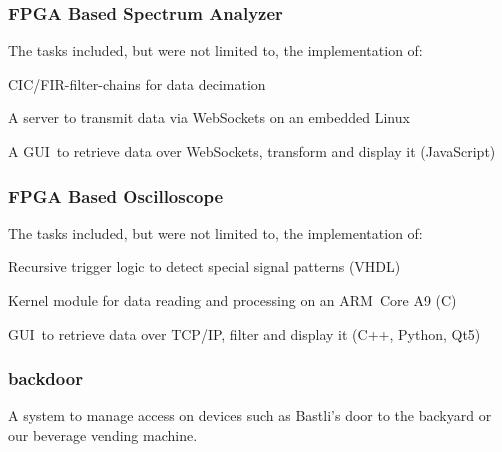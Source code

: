 \begin{timeline}
    \subsubsection{FPGA Based Spectrum Analyzer}
    The tasks included, but were not limited to, the implementation of:
    \begin{tightemize}
    \item CIC/FIR-filter-chains for data decimation
    \item A server to transmit data via WebSockets on an embedded Linux
    \item A GUI to retrieve data over WebSockets, transform and display it (JavaScript)
    \end{tightemize}
    \sectionsep
    
    \subsubsection{FPGA Based Oscilloscope}
    The tasks included, but were not limited to, the implementation of:
    \begin{tightemize}
    \item Recursive trigger logic to detect special signal patterns (VHDL)
    \item Kernel module for data reading and processing on an ARM Core A9 (C)
    \item GUI to retrieve data over TCP/IP, filter and display it (C++, Python, Qt5)
    \end{tightemize}
    \sectionsep
    
    
    \subsubsection{backdoor}
    A system to manage access on devices such as Bastli's door to the backyard or our beverage vending machine.
    \end{timeline}%